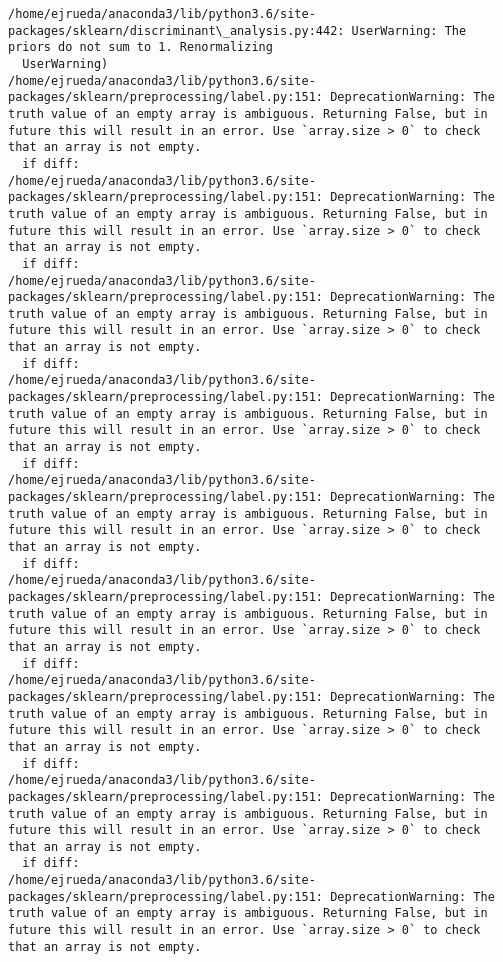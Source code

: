 \documentclass[11pt]{article}
\begin{document}
    \begin{Verbatim}[commandchars=\\\{\}]
/home/ejrueda/anaconda3/lib/python3.6/site-packages/sklearn/discriminant\_analysis.py:442: UserWarning: The priors do not sum to 1. Renormalizing
  UserWarning)
/home/ejrueda/anaconda3/lib/python3.6/site-packages/sklearn/preprocessing/label.py:151: DeprecationWarning: The truth value of an empty array is ambiguous. Returning False, but in future this will result in an error. Use `array.size > 0` to check that an array is not empty.
  if diff:
/home/ejrueda/anaconda3/lib/python3.6/site-packages/sklearn/preprocessing/label.py:151: DeprecationWarning: The truth value of an empty array is ambiguous. Returning False, but in future this will result in an error. Use `array.size > 0` to check that an array is not empty.
  if diff:
/home/ejrueda/anaconda3/lib/python3.6/site-packages/sklearn/preprocessing/label.py:151: DeprecationWarning: The truth value of an empty array is ambiguous. Returning False, but in future this will result in an error. Use `array.size > 0` to check that an array is not empty.
  if diff:
/home/ejrueda/anaconda3/lib/python3.6/site-packages/sklearn/preprocessing/label.py:151: DeprecationWarning: The truth value of an empty array is ambiguous. Returning False, but in future this will result in an error. Use `array.size > 0` to check that an array is not empty.
  if diff:
/home/ejrueda/anaconda3/lib/python3.6/site-packages/sklearn/preprocessing/label.py:151: DeprecationWarning: The truth value of an empty array is ambiguous. Returning False, but in future this will result in an error. Use `array.size > 0` to check that an array is not empty.
  if diff:
/home/ejrueda/anaconda3/lib/python3.6/site-packages/sklearn/preprocessing/label.py:151: DeprecationWarning: The truth value of an empty array is ambiguous. Returning False, but in future this will result in an error. Use `array.size > 0` to check that an array is not empty.
  if diff:
/home/ejrueda/anaconda3/lib/python3.6/site-packages/sklearn/preprocessing/label.py:151: DeprecationWarning: The truth value of an empty array is ambiguous. Returning False, but in future this will result in an error. Use `array.size > 0` to check that an array is not empty.
  if diff:
/home/ejrueda/anaconda3/lib/python3.6/site-packages/sklearn/preprocessing/label.py:151: DeprecationWarning: The truth value of an empty array is ambiguous. Returning False, but in future this will result in an error. Use `array.size > 0` to check that an array is not empty.
  if diff:
/home/ejrueda/anaconda3/lib/python3.6/site-packages/sklearn/preprocessing/label.py:151: DeprecationWarning: The truth value of an empty array is ambiguous. Returning False, but in future this will result in an error. Use `array.size > 0` to check that an array is not empty.

\end{Verbatim}
\end{document}
